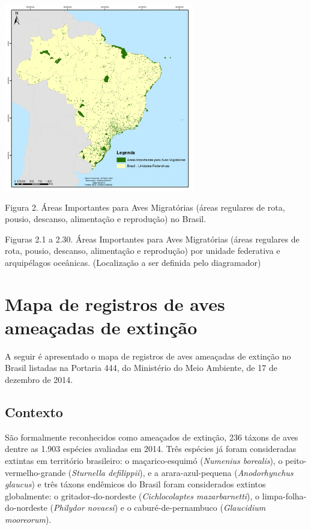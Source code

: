 \documentclass[
]{scrbook}
\begin{document}
\begin{center}\includegraphics[width=0.8\linewidth]{imagens/figura02} \end{center}

Figura 2. Áreas Importantes para Aves Migratórias (áreas regulares de rota, pousio, descanso, alimentação e reprodução) no Brasil.

Figuras 2.1 a 2.30. Áreas Importantes para Aves Migratórias (áreas regulares de rota, pousio, descanso, alimentação e reprodução) por unidade federativa e arquipélagos oceânicas. (Localização a ser definida pelo diagramador)

\hypertarget{mapa-ameacadas}{%
\section{Mapa de registros de aves ameaçadas de extinção}\label{mapa-ameacadas}}

A seguir é apresentado o mapa de registros de aves ameaçadas de extinção no Brasil listadas na Portaria 444, do Ministério do Meio Ambiente, de 17 de dezembro de 2014.

\hypertarget{contexto}{%
\subsection{Contexto}\label{contexto}}

São formalmente reconhecidos como ameaçados de extinção, 236 táxons de aves dentre as 1.903 espécies avaliadas em 2014. Três espécies já foram consideradas extintas em território brasileiro: o maçarico-esquimó (\emph{Numenius borealis}), o peito-vermelho-grande (\emph{Sturnella defilippii}), e a arara-azul-pequena (\emph{Anodorhynchus glaucus}) e três táxons endêmicos do Brasil foram considerados extintos globalmente: o gritador-do-nordeste (\emph{Cichlocolaptes mazarbarnetti}), o limpa-folha-do-nordeste (\emph{Philydor novaesi}) e o caburé-de-pernambuco (\emph{Glaucidium mooreorum}).
\end{document}
